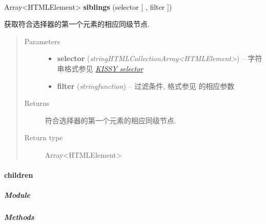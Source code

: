 \documentclass[letterpaper,10pt,english]{sphinxmanual}
\begin{document}
\begin{fulllineitems}
\label{api/core/dom/siblings:DOM.siblings}~
\begin{DUlineblock}{0em}
\item[] Array\textless{}HTMLElement\textgreater{} \textbf{siblings} (selector {[} , filter {]})
\item[] 获取符合选择器的第一个元素的相应同级节点.
\end{DUlineblock}
\begin{quote}\begin{description}
\item[{Parameters}] \leavevmode\begin{itemize}
\item {}
\textbf{selector} (\emph{string\textbar{}HTMLCollection\textbar{}Array\textless{}HTMLElement\textgreater{}}) -- 字符串格式参见 {\hyperref[api/core/dom/selector:dom-selector]{\emph{KISSY selector}}}

\item {}
\textbf{filter} (\emph{string\textbar{}function}) -- 过滤条件, 格式参见 {\hyperref[api/core/dom/filter:DOM.filter]{}} 的相应参数

\end{itemize}

\item[{Returns}] \leavevmode
符合选择器的第一个元素的相应同级节点.

\item[{Return type}] \leavevmode
Array\textless{}HTMLElement\textgreater{}

\end{description}\end{quote}

\end{fulllineitems}



\paragraph{children}
\label{api/core/dom/children::doc}\label{api/core/dom/children:children}

\subparagraph{Module}
\label{api/core/dom/children:module}\begin{quote}

{\hyperref[api/core/dom/index:module-DOM]{}}
\end{quote}


\subparagraph{Methods}
\label{api/core/dom/children:methods}
\end{document}
